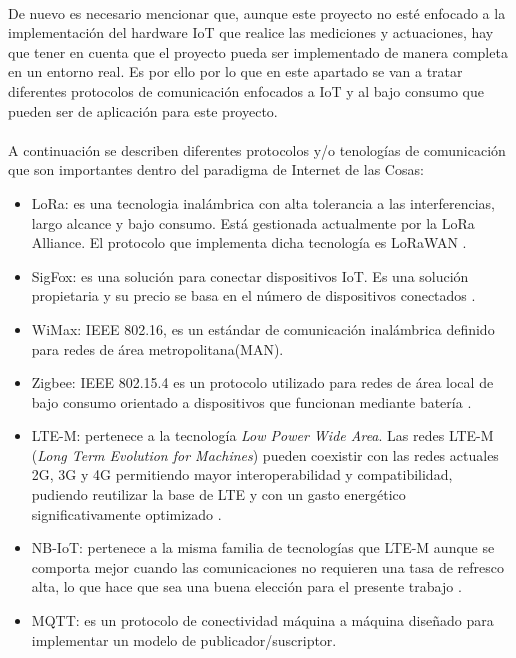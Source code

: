 \documentclass[../../memoria.tex]{subfiles}
\begin{document}
\paragraph{}
De nuevo es necesario mencionar que, aunque este proyecto no esté enfocado a la implementación del hardware IoT que realice las mediciones y actuaciones, hay que tener en cuenta que el proyecto pueda ser implementado de manera completa en un entorno real. Es por ello por lo que en este apartado se van a tratar diferentes protocolos de comunicación enfocados a IoT y al bajo consumo que pueden ser de aplicación para este proyecto.

\paragraph{}
A continuación se describen diferentes protocolos y/o tenologías de comunicación que son importantes dentro del paradigma de Internet de las Cosas:

\begin{itemize}
    \item LoRa: es una tecnologia inalámbrica con alta tolerancia a las interferencias, largo alcance y bajo consumo. Está gestionada actualmente por la LoRa Alliance. El protocolo que implementa dicha tecnología es LoRaWAN \cite{lora} \cite{loratech}.

    \item SigFox: es una solución para conectar dispositivos IoT. Es una solución propietaria y su precio se basa en el número de dispositivos conectados \cite{sigfox}.

    \item WiMax: IEEE 802.16, es un estándar de comunicación inalámbrica definido para redes de área metropolitana(MAN). \cite{wimax}

    \item Zigbee: IEEE 802.15.4 es un protocolo utilizado para redes de área local de bajo consumo orientado a dispositivos que funcionan mediante batería \cite{zigbee}.

    \item LTE-M: pertenece a la tecnología \textit{Low Power Wide Area}. Las redes LTE-M (\textit{Long Term Evolution for Machines}) pueden coexistir con las redes actuales 2G, 3G y 4G permitiendo mayor interoperabilidad y compatibilidad, pudiendo reutilizar la base de LTE y con un gasto energético significativamente optimizado \cite{ltem}.

    \item NB-IoT: pertenece a la misma familia de tecnologías que LTE-M aunque se comporta mejor cuando las comunicaciones no requieren una tasa de refresco alta, lo que hace que sea una buena elección para el presente trabajo \cite{nbiot2} \cite{nbiot}.

    \item MQTT: es un protocolo de conectividad máquina a máquina diseñado para implementar un modelo de publicador/suscriptor. \cite{mqtt}
\end{itemize}
\end{document}
